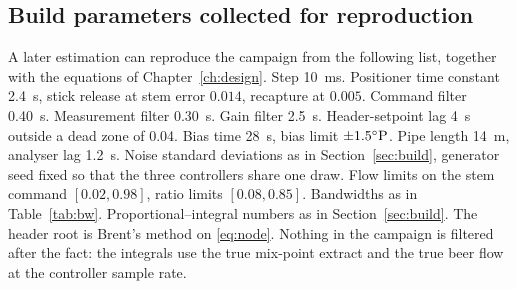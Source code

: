 \subsection{Build parameters collected for reproduction}

A later estimation can reproduce the campaign from the following list, together with the equations of Chapter~\ref{ch:design}. Step \SI{10}{ms}. Positioner time constant \SI{2.4}{s}, stick release at stem error $0.014$, recapture at $0.005$. Command filter \SI{0.40}{s}. Measurement filter \SI{0.30}{s}. Gain filter \SI{2.5}{s}. Header-setpoint lag \SI{4}{s} outside a dead zone of \SI{0.04}{\barg}. Bias time \SI{28}{s}, bias limit $\pm 1.5^{\circ}\mathrm{P}$. Pipe length \SI{14}{m}, analyser lag \SI{1.2}{s}. Noise standard deviations as in Section~\ref{sec:build}, generator seed fixed so that the three controllers share one draw. Flow limits on the stem command $[0.02,0.98]$, ratio limits $[0.08,0.85]$. Bandwidths as in Table~\ref{tab:bw}. Proportional--integral numbers as in Section~\ref{sec:build}. The header root is Brent's method on \eqref{eq:node}. Nothing in the campaign is filtered after the fact: the integrals use the true mix-point extract and the true beer flow at the controller sample rate.

\FloatBarrier
{}
